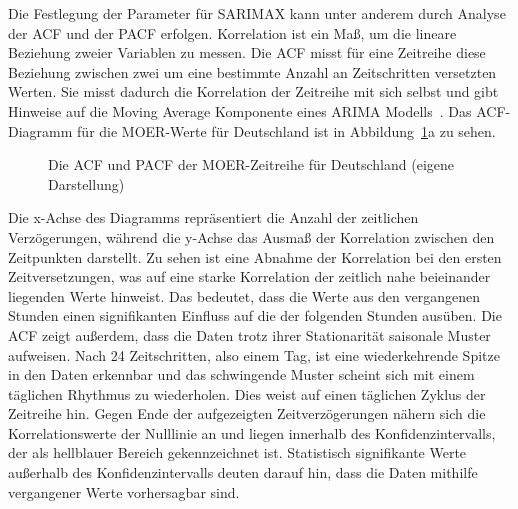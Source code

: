 Die Festlegung der Parameter für \ac{SARIMAX} kann unter anderem durch Analyse der \ac{ACF} und der \ac{PACF} erfolgen.
Korrelation ist ein Maß, um die lineare Beziehung zweier Variablen zu messen.
Die \ac{ACF} misst für eine Zeitreihe diese Beziehung zwischen zwei um eine bestimmte Anzahl an Zeitschritten versetzten Werten.
Sie misst dadurch die Korrelation der Zeitreihe mit sich selbst und gibt Hinweise auf die Moving Average Komponente eines \ac{ARIMA} Modells~\cite{Peixeiro.2022}.
Das \ac{ACF}-Diagramm für die \ac{MOER}-Werte für Deutschland ist in Abbildung~\ref{FIG:acf_pacf_moer_de}a zu sehen.
\begin{figure}
 \centering
 \qquad
 \caption[ACF und PACF der MOER Deutschlands]{Die ACF und PACF der MOER-Zeitreihe für Deutschland (eigene Darstellung)}%
 \label{FIG:acf_pacf_moer_de}%
\end{figure}
Die x-Achse des Diagramms repräsentiert die Anzahl der zeitlichen Verzögerungen, während die y-Achse das Ausmaß der Korrelation zwischen den Zeitpunkten darstellt.
Zu sehen ist eine Abnahme der Korrelation bei den ersten Zeitversetzungen, was auf eine starke Korrelation der zeitlich nahe beieinander liegenden Werte hinweist.
Das bedeutet, dass die Werte aus den vergangenen Stunden einen signifikanten Einfluss auf die der folgenden Stunden ausüben.
Die \ac{ACF} zeigt außerdem, dass die Daten trotz ihrer Stationarität saisonale Muster aufweisen.
Nach 24 Zeitschritten, also einem Tag, ist eine wiederkehrende Spitze in den Daten erkennbar und das schwingende Muster scheint sich mit einem täglichen Rhythmus zu wiederholen.
Dies weist auf einen täglichen Zyklus der Zeitreihe hin.
Gegen Ende der aufgezeigten Zeitverzögerungen nähern sich die Korrelationswerte der Nulllinie an und liegen innerhalb des Konfidenzintervalls, der als hellblauer Bereich gekennzeichnet ist.
Statistisch signifikante Werte außerhalb des Konfidenzintervalls deuten darauf hin, dass die Daten mithilfe vergangener Werte vorhersagbar sind.

